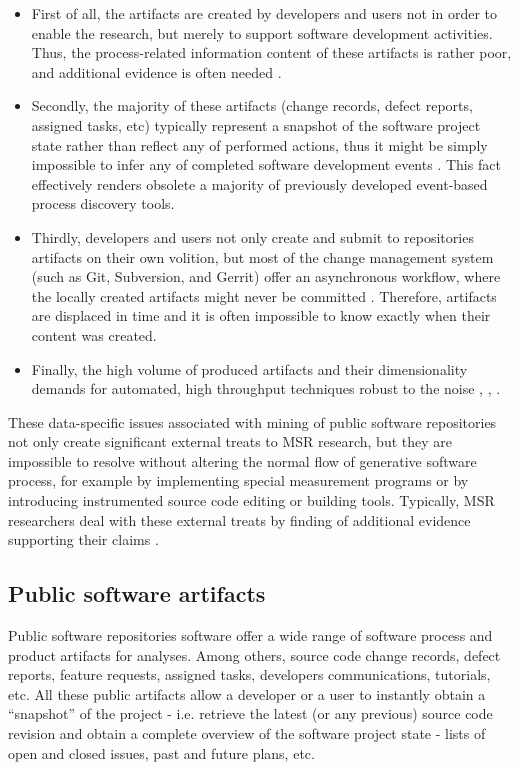 \begin{itemize}
 \item First of all, the artifacts are created by developers and users not in order to enable the research,
but merely to support software development activities. Thus, the process-related information content of these
artifacts is rather poor, and additional evidence is often needed \cite{citeulike:342840} \cite{citeulike:7954249} 
\cite{citeulike:7260421}.
 \item Secondly, the majority of these artifacts (change records, defect reports, assigned tasks, etc) 
typically represent a snapshot of the software project state rather than reflect any of performed actions, 
thus it might be simply impossible to infer any of completed software development events \cite{citeulike:1296888}.
This fact effectively renders obsolete a majority of previously developed event-based process discovery tools.
 \item Thirdly, developers and users not only create and submit to repositories artifacts on their own volition,
but most of the change management system (such as Git, Subversion, and Gerrit) offer an asynchronous workflow, 
where the locally created artifacts might never be committed \cite{citeulike:2280690} \cite{citeulike:9037939}. 
Therefore, artifacts are displaced in time and it is often impossible to know exactly when their content was created.
 \item Finally, the high volume of produced artifacts and their dimensionality demands for automated, high throughput 
techniques robust to the noise \cite{citeulike:12550438}, \cite{citeulike:7853299}, \cite{citeulike:4534888}.
\end{itemize}

These data-specific issues associated with mining of public software repositories not only create significant external treats 
to MSR research, but they are impossible to resolve without altering the normal flow of generative software process, 
for example by implementing special measurement programs or by introducing instrumented source code editing or building tools. 
Typically, MSR researchers deal with these external treats by finding of additional evidence supporting their 
claims \cite{citeulike:5043664} \cite{citeulike:5128808}.

\subsection{Public software artifacts}
Public software repositories software offer a wide range of software process and product artifacts for analyses.
Among others, source code change records, defect reports, feature requests, assigned tasks, developers communications, 
tutorials, etc. All these public artifacts allow a developer or a user to instantly obtain a ``snapshot'' of the project - 
i.e. retrieve the latest (or any previous) source code revision and obtain a complete overview of the software project 
state - lists of open and closed issues, past and future plans, etc.

